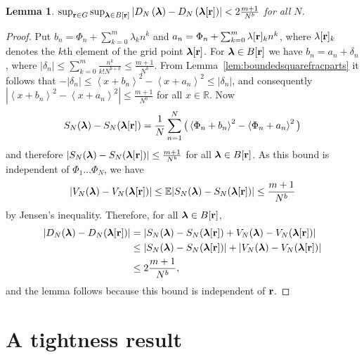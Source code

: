 \documentclass[aap,preprint]{imsart}
\newcommand{\reals}{{\mathbb R}}
\newcommand{\expect}{{\mathbb E}}
\newcommand{\fracpart}[1]{\left\langle #1 \right\rangle}
\newcommand{\sabs}[1]{\vert #1 \vert}
\newtheorem{lemma}{Lemma}
\begin{document}
 \begin{lemma}\label{lem:supBVn} $\sup_{\mathbf{r}\in G}\sup_{ \boldsymbol{\lambda}  \in B[\mathbf{r}] }\left\vert D_N\left(  \boldsymbol{\lambda} \right) - D_N\left(  \boldsymbol{\lambda}[\mathbf{r}] \right)\right\vert < 2\frac{m+1}{N^b}$ for all $N$.
 \end{lemma}
 \begin{proof}
Put $b_n = \Phi_n + \sum_{k = 0}^{m}{\lambda_k n^k}$ and $a_n = \Phi_n + \sum_{k = 0}^{m}{\lambda[\mathbf{r}]_k n^k}$, where $\lambda[\mathbf{r}]_k$ denotes the $k$th element of the grid point $\boldsymbol{\lambda}[\mathbf{r}]$. For $\boldsymbol{\lambda} \in B[\mathbf{r}]$ we have $b_n = a_n + \delta_n$,
where $\sabs{\delta_n} \leq \sum_{k=0}^m\frac{n^k}{k! N^{b+k}} \leq \frac{m+1}{N^{b}}$.  From Lemma~\ref{lem:boundedsquarefracparts} it follows that $-|\delta_n| \leq \fracpart{x + b_n}^2 -  \fracpart{x + a_n}^2  \leq |\delta_n|$,
and consequently $|\fracpart{x + b_n}^2 -  \fracpart{x + a_n}^2| \leq \tfrac{m+1}{N^b}$ for all $x \in \reals$. Now
\[
S_N(\lambdabf) - S_N(\lambdabf[\rbf]) =  \frac{1}{N}\sum_{n=1}^{N}\big( \fracpart{\Phi_n + b_n}^2 -  \fracpart{\Phi_n + a_n}^2 \big)
\]
and therefore $\sabs{S_N(\lambdabf) - S_N(\lambdabf[\rbf])} \leq \frac{m+1}{N^b}$ for all $\boldsymbol{\lambda} \in B[\mathbf{r}]$.  As this bound is independent of $\Phi_1 \dots \Phi_N$, we have
\[
\sabs{ V_N(\lambdabf) - V_N(\lambdabf[\rbf])} \leq \expect \sabs{ S_N(\lambdabf) - S_N(\lambdabf[\rbf])} \leq \frac{m+1}{N^b}
\]
by Jensen's inequality.  Therefore, for all $\boldsymbol{\lambda} \in B[\mathbf{r}]$,
 \begin{align*}
 \sabs{ D_N(\lambdabf) - D_N(\lambdabf[\rbf]) } &= \sabs{ S_N(\lambdabf) - S_N(\lambdabf[\rbf]) + V_N(\lambdabf) - V_N(\lambdabf[\rbf]) } \\
&\leq \sabs{ S_N(\lambdabf) - S_N(\lambdabf[\rbf]) \vert + \vert V_N(\lambdabf) - V_N(\lambdabf[\rbf]) } \\
&\leq 2\frac{m+1}{N^{b}},
\end{align*}
and the lemma follows because this bound is independent of $\mathbf{r}$.
 \end{proof}


\section{A tightness result}\label{app:tightness-result}
\end{document}
